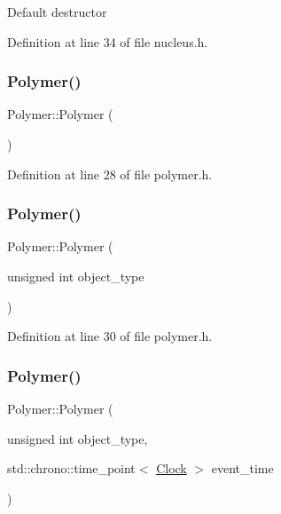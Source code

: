 Default destructor 

Definition at line 34 of file nucleus.\+h.

\mbox{\label{class_polymer_a0f7d915300bfec223c4025f8e9d4f46d}} 
\subsubsection{\texorpdfstring{Polymer()}{Polymer()}\hspace{0.1cm}{\footnotesize\ttfamily [10/14]}}
{\footnotesize\ttfamily Polymer\+::\+Polymer (\begin{DoxyParamCaption}{ }\end{DoxyParamCaption})\hspace{0.3cm}{\ttfamily [inline]}}



Definition at line 28 of file polymer.\+h.

\mbox{\label{class_polymer_adb35b8b7a5eae1e39187c0e525b0d9b1}} 
\subsubsection{\texorpdfstring{Polymer()}{Polymer()}\hspace{0.1cm}{\footnotesize\ttfamily [11/14]}}
{\footnotesize\ttfamily Polymer\+::\+Polymer (\begin{DoxyParamCaption}\item[{unsigned int}]{object\+\_\+type }\end{DoxyParamCaption})\hspace{0.3cm}{\ttfamily [inline]}}



Definition at line 30 of file polymer.\+h.

\mbox{\label{class_polymer_af918b8776cfd76d9ae4611bf35d4192a}} 
\subsubsection{\texorpdfstring{Polymer()}{Polymer()}\hspace{0.1cm}{\footnotesize\ttfamily [12/14]}}
{\footnotesize\ttfamily Polymer\+::\+Polymer (\begin{DoxyParamCaption}\item[{unsigned int}]{object\+\_\+type,  }\item[{std\+::chrono\+::time\+\_\+point$<$ \hyperlink{universe_8h_a0ef8d951d1ca5ab3cfaf7ab4c7a6fd80}{Clock} $>$}]{event\+\_\+time }\end{DoxyParamCaption})\hspace{0.3cm}{\ttfamily [inline]}}



